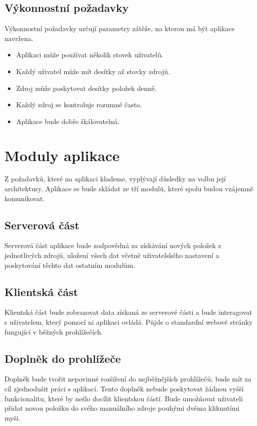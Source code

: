 \subsection{Výkonnostní požadavky}

Výkonnostní požadavky určují parametry zátěže, na kterou má být aplikace navržena.

\begin{itemize}
	\item Aplikaci může používat několik stovek uživatelů.
    \item Každý uživatel může mít desítky až stovky zdrojů.
	\item Zdroj může poskytovat desítky položek denně.
    \item Každý zdroj se kontroluje rozumně často.
    \item Aplikace bude dobře škálovatelná.
\end{itemize}

\section{Moduly aplikace}

Z požadavků, které na aplikaci klademe, vyplývají důsledky na volbu její architektury.
Aplikace se bude skládat ze tří modulů, které spolu budou vzájemně komunikovat.


\subsection{Serverová část}

Serverová část aplikace bude zodpovědná za získávání nových položek z jednotlivých zdrojů, uložení všech dat včetně uživatelského nastavení a poskytování těchto dat ostatním modulům.

\subsection{Klientská část}

Klientská část bude zobrazovat data získaná ze serverové části a bude interagovat s uživatelem, který pomocí ni aplikaci ovládá.
Půjde o standardní webové stránky fungující v běžných prohlížečích.

\subsection{Doplněk do prohlížeče}

Doplněk bude tvořit nepovinné rozšíření do nejběžnějších prohlížečů; bude mít za cíl zjednodušit práci s aplikací.
Tento doplněk nebude poskytovat žádnou vyšší funkcionalitu, které by nešlo docílit klientskou částí.
Bude umožňovat uživateli přidat novou položku do svého manuálního zdroje pouhými dvěma kliknutími myši.

